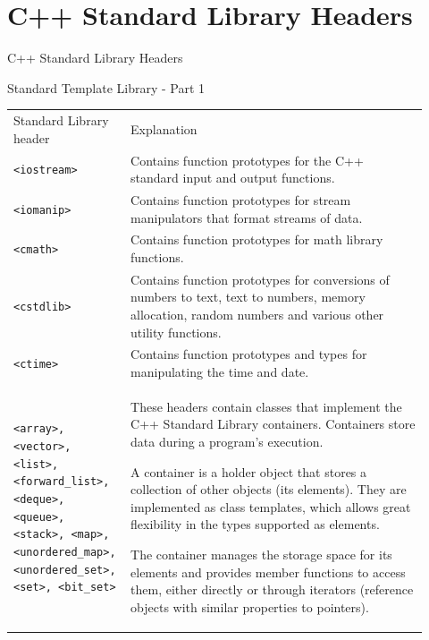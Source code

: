 \documentclass[10pt]{beamer}
\begin{document}
\section{C++ Standard Library Headers}
\begin{frame}{C++ Standard Library Headers}
	\lipsum[2]
\end{frame}

\begin{frame}
	{Standard Template Library - Part 1\vspace{5pt}}
	\centering\scriptsize\renewcommand{\arraystretch}{2}
	\begin{tabular}{p{0.22\linewidth} p{0.7\linewidth}}
		
		\rowcolor{cyan}\color{white} Standard Library header & \color{white} Explanation\\
		
		\rowcolor{lightcyan} \texttt{<iostream>} & Contains function prototypes for the C++ standard input and output functions. \\
		\rowcolor{lightcyan} \texttt{<iomanip>} & Contains function prototypes for stream manipulators that format streams of data. \\
		\rowcolor{lightcyan} \texttt{<cmath>} & Contains function prototypes for math library functions. \\
		\rowcolor{lightcyan} \texttt{<cstdlib>} & Contains function prototypes for conversions of numbers to text, text to numbers, memory allocation, random numbers and various other utility functions. \\
		\rowcolor{lightcyan} \texttt{<ctime>} & Contains function prototypes and types for manipulating the time and date. \\
		\rowcolor{lightcyan} \texttt{<array>,
			<vector>, <list>,
			<forward\_list>,
			<deque>, <queue>,
			<stack>, <map>,
			<unordered\_map>,
			<unordered\_set>,
			<set>, <bit\_set>} & These headers contain classes that implement the C++ Standard Library
		containers. Containers store data during a program’s execution. 
		
		A container is a holder object that stores a collection of other objects (its elements). They are implemented as class templates, which allows great flexibility in the types supported as elements. 
		
		The container manages the storage space for its elements and provides member functions to access them, either directly or through iterators (reference objects with similar properties to pointers). 
	\end{tabular}
\end{frame}
\end{document}
